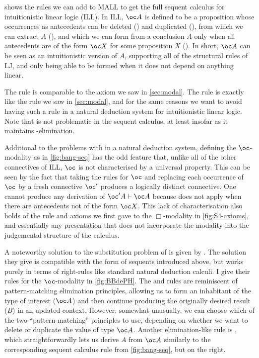  shows the rules we can add to MALL to get the full sequent
calculus for intuitionistic linear logic (ILL).
In ILL, $\oc A$ is defined
to be a proposition whose occurrences as antecedents can be deleted
() and duplicated (), from which we can
extract $A$ (), and which we can form from a conclusion
$A$ only when all antecedents are of the form $\oc X$ for some proposition $X$
().
In short, $\oc A$ can be seen as an intuitionistic version of $A$, supporting
all of the structural rules of LJ, and only being able to be formed when it
does not depend on anything linear.

The  rule is comparable to the  axiom we saw in
\cref{sec:modal}.
The  rule is exactly like the  rule we saw
in \cref{sec:modal}, and for the same reasons we want to avoid having such a
rule in a natural deduction system for intuitionistic linear logic.
Note that  is not problematic in the sequent calculus, at
least insofar as it maintains -elimination.

Additional to the problems with  in a natural deduction
system, defining the $\oc$-modality as in \cref{fig:bang-seq} has the odd
feature that, unlike all of the other connectives of ILL, $\oc$ is not
characterised by a universal property.
This can be seen by the fact that taking the rules for $\oc$ and replacing each
occurrence of $\oc$ by a fresh connective $\oc'$ produces a logically distinct
connective.
One cannot produce any derivation of $\oc' A \vdash \oc A$ because
 does not apply when there are antecedents not of the form
$\oc X$.
This lack of characterisation also holds of the rule and axioms we first gave to
the $\Box$-modality in \cref{fig:S4-axioms}, and essentially any presentation
that does not incorporate the modality into the judgemental structure of the
calculus.

A noteworthy solution to the substitution problem of  is
given by \citet{BBdePH93}.
The solution they give is compatible with the form of sequents introduced above,
but works purely in terms of right-rules like standard natural deduction
calculi.
I give their rules for the $\oc$-modality in \cref{fig:BBdePH}.
The  and  rules are reminiscent of
pattern-matching elimination principles, allowing us to form an inhabitant of
the type of interest ($\oc A$) and then continue producing the originally
desired result ($B$) in an updated context.
However, somewhat unusually, we can choose which of the two ``pattern-matching''
principles to use, depending on whether we want to delete or duplicate the
value of type $\oc A$.
Another elimination-like rule is , which straightforwardly
lets us derive $A$ from $\oc A$ similarly to the corresponding sequent calculus
rule from \cref{fig:bang-seq}, but on the right.

